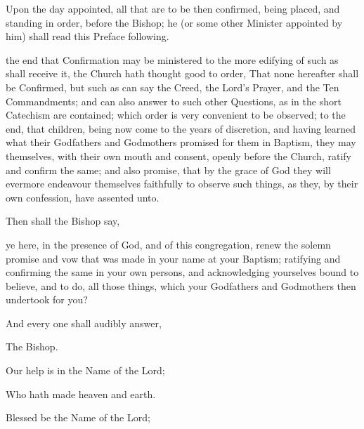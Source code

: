 
\begin{rubric}
Upon the day appointed, all that are to be then confirmed, being placed, and standing in order, before the Bishop; he (or some other Minister appointed by him) shall read this Preface following.
\end{rubric}

 the end that Confirmation may be ministered to the more edifying of such as shall receive it, the Church hath thought good to order, That none hereafter shall be Confirmed, but such as can say the Creed, the Lord's Prayer, and the Ten Commandments; and can also answer to such other Questions, as in the short Catechism are contained; which order is very convenient to be observed; to the end, that children, being now come to the years of discretion, and having learned what their Godfathers and Godmothers promised for them in Baptism, they may themselves, with their own mouth and consent, openly before the Church, ratify and confirm the same; and also promise, that by the grace of God they will evermore endeavour themselves faithfully to observe such things, as they, by their own confession, have assented unto.

\begin{rubric}
Then shall the Bishop say,
\end{rubric}

 ye here, in the presence of God, and of this congregation, renew the solemn promise and vow that was made in your name at your Baptism; ratifying and confirming the same in your own persons, and acknowledging yourselves bound to believe, and to do, all those things, which your Godfathers and Godmothers then undertook for you?

\begin{rubric}
And every one shall audibly answer,
\end{rubric}


\newpage

\begin{rubric}
The Bishop.
\end{rubric}

Our help is in the Name of the Lord;

 Who hath made heaven and earth.

 Blessed be the Name of the Lord;

